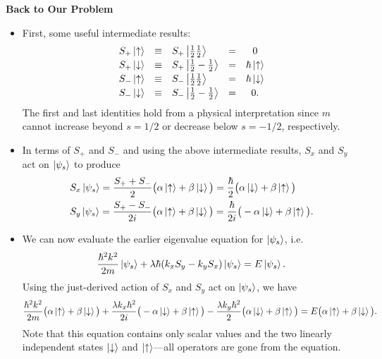 \documentclass[11pt, a4paper]{article}
\newcommand{\p}{\psi}  %
\newcommand{\ua}{\uparrow}  %
\newcommand{\da}{\downarrow}  %
\begin{document}
\textbf{Back to Our Problem}
\begin{itemize}
	\item  First, some useful intermediate results:
	\[
	\begin{array}{cclcc}
		 S_{+}\ket{\ua} & \equiv & S_{+}\ket{\tfrac{1}{2} \tfrac{1}{2}} & = & 0\\[0.2em]
		 S_{+}\ket{\da} & \equiv &S_{+}\ket{\tfrac{1}{2} -\tfrac{1}{2}} & = & \hbar \ket{\ua}\\[0.2em]
		 S_{-}\ket{\ua} & \equiv & S_{-}\ket{\tfrac{1}{2} \tfrac{1}{2}} & = & \hbar \ket{\da}\\[0.2em]
		 S_{-}\ket{\da} & \equiv & S_{-}\ket{\tfrac{1}{2}- \tfrac{1}{2}} & = & 0.
	\end{array}
	\]
	The first and last identities hold from a physical interpretation since $ m $ cannot increase beyond $ s = 1/2 $ or decrease below $ s = -1/2$, respectively.

	\item In terms of $ S_{+} $ and $ S_{-} $ and using the above intermediate results, $ S_{x} $ and $ S_{y} $ act on $ \ket{\psi_{s}} $ to produce
	\begin{align*}
		&S_{x}\ket{\psi_{s}} = \frac{S_{+}+S_{-}}{2} \big(\alpha \ket{\ua} + \beta \ket{\da}\big) = \frac{\hbar}{2} \big(\alpha \ket{\da} + \beta \ket{\ua}\big)\\
		&S_{y}\ket{\psi_{s}} = \frac{S_{+}-S_{-}}{2i} \big(\alpha \ket{\ua} + \beta \ket{\da}\big) = \frac{\hbar}{2i} \big(-\alpha \ket{\da} + \beta \ket{\ua}\big).
	\end{align*} 
	
	\item We can now evaluate the earlier eigenvalue equation for $ \ket{\p_{s}} $, i.e.
	\begin{equation*}
		\frac{\hbar^{2}k^{2}}{2m}\ket{\psi_{s}} + \lambda \hbar (k_{x}S_{y} - k_{y}S_{x})\ket{\psi_{s}} = E\ket{\psi_{s}}.
	\end{equation*}
	Using the just-derived action of $ S_{x} $ and $ S_{y} $ act on $ \ket{\psi_{s}} $, we have
	\begin{equation*}
		\frac{\hbar^{2}k^{2}}{2m}\big(\alpha \ket{\ua} + \beta \ket{\da}\big)+ \frac{\lambda k_{x} \hbar^{2}}{2i} \big(-\alpha \ket{\da} + \beta \ket{\ua}\big) - \frac{\lambda k_{y} \hbar^{2}}{2} \big(\alpha \ket{\da} + \beta \ket{\ua}\big) = E\big(\alpha \ket{\ua} + \beta \ket{\da}\big).
	\end{equation*}
	Note that this equation contains only scalar values and the two linearly independent states $ \ket{\da} $ and $ \ket{\ua} $---all operators are gone from the equation. 
	

\end{itemize}
\end{document}
